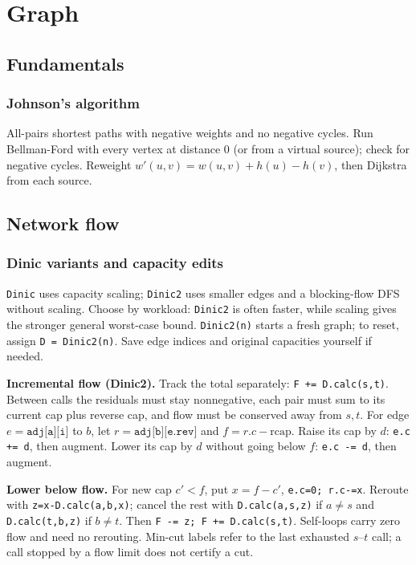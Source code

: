 \chapter{Graph}

\section{Fundamentals}
	\subsection{Johnson's algorithm}
		All-pairs shortest paths with negative weights and no
		negative cycles. Run Bellman-Ford with every vertex at
		distance 0 (or from a virtual source); check for negative
		cycles. Reweight $w'(u,v)=w(u,v)+h(u)-h(v)$, then Dijkstra
		from each source.

\section{Network flow}
	\subsection{Dinic variants and capacity edits}
		\texttt{Dinic} uses capacity scaling; \texttt{Dinic2}
		uses smaller edges and a blocking-flow DFS without scaling.
		Choose by workload: \texttt{Dinic2} is often faster,
		while scaling gives the stronger general worst-case bound.
		\texttt{Dinic2(n)} starts a fresh graph; to reset,
		assign \texttt{D = Dinic2(n)}. Save edge indices and
		original capacities yourself if needed.

		\noindent\textbf{Incremental flow (Dinic2).}
		Track the total separately: \texttt{F += D.calc(s,t)}.
		Between calls the residuals must stay nonnegative,
		each pair must sum to its current cap plus reverse cap,
		and flow must be conserved away from $s,t$.
		For edge $e=\texttt{adj[a][i]}$ to $b$, let
		$r=\texttt{adj[b][e.rev]}$ and $f=r.c-\text{rcap}$.
		Raise its cap by $d$: \texttt{e.c += d}, then augment.
		Lower its cap by $d$ without going below $f$:
		\texttt{e.c -= d}, then augment.

		\noindent\textbf{Lower below flow.}
		For new cap $c'<f$, put $x=f-c'$,
		\texttt{e.c=0; r.c-=x}.
		Reroute with \texttt{z=x-D.calc(a,b,x)};
		cancel the rest with \texttt{D.calc(a,s,z)} if $a\ne s$
		and \texttt{D.calc(t,b,z)} if $b\ne t$.
		Then \texttt{F -= z; F += D.calc(s,t)}.
		Self-loops carry zero flow and need no rerouting.
		Min-cut labels refer to the last exhausted $s$--$t$ call;
		a call stopped by a flow limit does not certify a cut.
